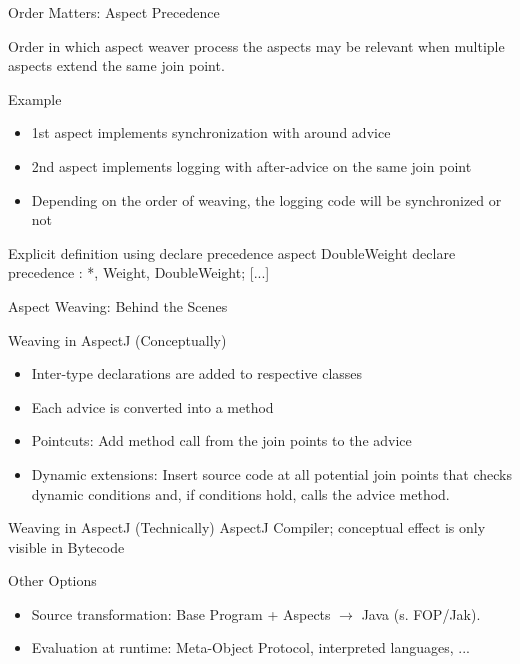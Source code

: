 \begin{frame}[fragile]{Order Matters: Aspect Precedence}
	\begin{mycolumns}[animation=none]
		\begin{note}{}
			Order in which aspect weaver process the aspects may be relevant when multiple aspects extend the same join point.
		\end{note}
		\begin{example}{Example}
			\begin{itemize}
				\item 1st aspect implements synchronization with around advice
				\item 2nd aspect implements logging with after-advice on the same join point
				\item Depending on the order of weaving, the logging code will be synchronized or not
			\end{itemize}
		\end{example}
	\mynextcolumn
\begin{codetight}{Explicit definition using declare precedence}
aspect DoubleWeight {
	declare precedence : *, Weight, DoubleWeight;
	[...]
}
\end{codetight}	
	\end{mycolumns}
\end{frame}

\begin{frame}{Aspect Weaving: Behind the Scenes}
	\begin{mycolumns}[animation=none]
		\begin{definition}{Weaving in AspectJ (Conceptually)}
			\begin{itemize}
				\item Inter-type declarations are added to respective classes
				\item Each advice is converted into a method
				\item Pointcuts: Add method call from the join points to the advice
				\item Dynamic extensions: Insert source code at all potential join points that checks dynamic conditions and, if conditions hold, calls the advice method.
			\end{itemize}
		\end{definition}
	\mynextcolumn
		\begin{note}{Weaving in AspectJ (Technically)}
			AspectJ Compiler; conceptual effect is only visible in Bytecode
		\end{note}
		\begin{note}{Other Options}
			\begin{itemize}
				\item Source transformation: Base Program + Aspects $\rightarrow$ Java (s. FOP/Jak).
				\item Evaluation at runtime: Meta-Object Protocol, interpreted languages, ...
			\end{itemize}
		\end{note}
	\end{mycolumns}
\end{frame}

